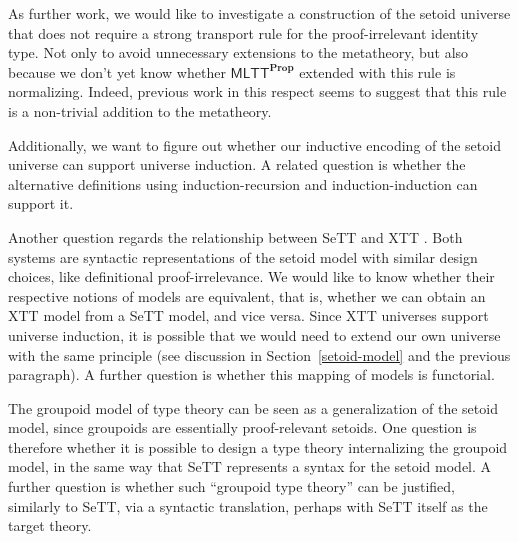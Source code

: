 \documentclass{easychair}
\newcommand{\mlttp}{\textsf{MLTT}^{\mProp}}
\newcommand{\mProp}{\mathbf{Prop}}
\begin{document}
As further work, we would like to investigate a construction of the setoid
universe that does not require a strong transport rule for the proof-irrelevant
identity type. Not only to avoid unnecessary extensions to the metatheory, but
also because we don't yet know whether $\mlttp$ extended with this rule is
normalizing.
%
Indeed, previous work in this respect \cite{abel2019failure} seems to suggest
that this rule is a non-trivial addition to the metatheory.

Additionally, we want to figure out whether our inductive encoding of the setoid
universe can support universe induction. A related question is whether the
alternative definitions using induction-recursion and induction-induction can
support it.

Another question regards the relationship between SeTT \cite{mpc19} and XTT
\cite{xtt}. Both systems are syntactic representations of the setoid model with
similar design choices, like definitional proof-irrelevance. We would like to
know whether their respective notions of models are equivalent, that is, whether
we can obtain an XTT model from a SeTT model, and vice versa. Since XTT
universes support universe induction, it is possible that we would need to
extend our own universe with the same principle (see discussion in
Section~\ref{setoid-model} and the previous paragraph). A further question is
whether this mapping of models is functorial.

The groupoid model of type theory \cite{groupoid} can be seen as a
generalization of the setoid model, since groupoids are essentially
proof-relevant setoids.
%
One question is therefore whether it is possible to design a type theory
internalizing the groupoid model, in the same way that SeTT represents a syntax
for the setoid model. A further question is whether such ``groupoid type
theory'' can be justified, similarly to SeTT, via a syntactic translation,
perhaps with SeTT itself as the target theory.



\end{document}
